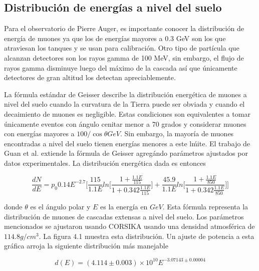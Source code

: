 \documentclass{book}
\begin{document}
\subsection{Distribuci\'on de energ\'ias a nivel del suelo}
Para el observatorio de Pierre Auger, es importante conocer la distribuci\'on de energ\'ia de muones ya que los de energ\'ias mayores a 0.3 GeV son los que atraviesan los tanques y se usan para calibraci\'on. Otro tipo de part\'icula que alcanzan detectores son los rayos gamma de 100 MeV, sin embargo, el flujo de rayos gamma disminuye luego del m\'aximo de la cascada as\'i que \'unicamente detectores de gran altitud los detectan apreciablemente. \citep{WATSON}

La fórmula estándar de Geisser describe la distribución energética de muones a nivel del suelo cuando la curvatura de la Tierra puede ser obviada y cuando el decaimiento de muones es negligible. Estas condiciones son equivalentes a tomar \'unicamente eventos con \'angulo cenitar menor a 70 grados y considerar muones con energ\'ias mayores a $100/\cos\theta GeV$. Sin embargo, la mayor\'ia de muones encontradas a nivel del suelo tienen energ\'ias menores a este l\'mite. El trabajo de Guan et al. extiende la f\'ormula de Geisser agreg\'ando par\'ametros ajustados por datos experimentales. La distribuci\'on energ\'etica dada es entonces

\begin{equation}
\frac{dN}{dE}=p_{0}0.14E^{-2.7}\Bigg[\frac{115}{1.1E}ln\Bigg[\frac{1+\frac{1.1E}{115}}{1+0.342\frac{1.1E}{115}}\Bigg]+\frac{45.9}{1.1E}ln\Bigg[\frac{1+\frac{1.1E}{850}}{1+0.342\frac{1.1E}{850}}\Bigg]\Bigg]
\end{equation}

donde $\theta$ es el \'angulo polar y $E$ es la energía en $GeV$. Esta f\'ormula representa la distribuci\'on de muones de cascadas extensas a nivel del suelo. Los par\'ametros mencionados se ajustaron usando CORSIKA usando una densidad atmosf\'erica de $114.8 g/cm^3$. La figura 4.1 muestra esta distribuci\'on. Un ajuste de potencia a esta gr\'afica arroja la siguiente distribuci\'on m\'as manejable \citep{GUAN}

\begin{equation}
d(E)=(4.114\pm0.003)\times10^{10}E^{-3.07143\pm0.00004}
\end{equation}
\end{document}

